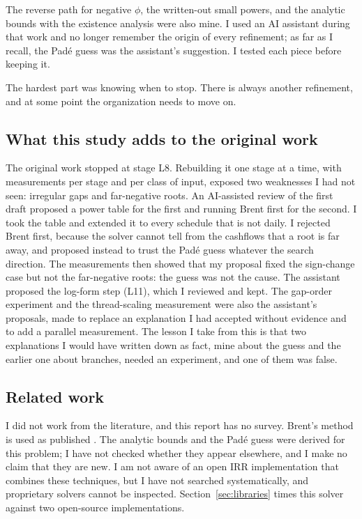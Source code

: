The reverse path for negative $\phi$, the written-out small powers, and the analytic bounds with the existence analysis were also mine. I used an AI assistant during that work and no longer remember the origin of every refinement; as far as I recall, the Pad\'e guess was the assistant's suggestion. I tested each piece before keeping it.

The hardest part was knowing when to stop. There is always another refinement, and at some point the organization needs to move on.

\subsection{What this study adds to the original work}
The original work stopped at stage L8. Rebuilding it one stage at a time, with measurements per stage and per class of input, exposed two weaknesses I had not seen: irregular gaps and far-negative roots. An AI-assisted review of the first draft proposed a power table for the first and running Brent first for the second. I took the table and extended it to every schedule that is not daily. I rejected Brent first, because the solver cannot tell from the cashflows that a root is far away, and proposed instead to trust the Pad\'e guess whatever the search direction. The measurements then showed that my proposal fixed the sign-change case but not the far-negative roots: the guess was not the cause. The assistant proposed the log-form step (L11), which I reviewed and kept. The gap-order experiment and the thread-scaling measurement were also the assistant's proposals, made to replace an explanation I had accepted without evidence and to add a parallel measurement. The lesson I take from this is that two explanations I would have written down as fact, mine about the guess and the earlier one about branches, needed an experiment, and one of them was false.

\subsection{Related work}
I did not work from the literature, and this report has no survey. Brent's method is used as published \cite{brent}. The analytic bounds and the Pad\'e guess were derived for this problem; I have not checked whether they appear elsewhere, and I make no claim that they are new. I am not aware of an open IRR implementation that combines these techniques, but I have not searched systematically, and proprietary solvers cannot be inspected. Section~\ref{sec:libraries} times this solver against two open-source implementations.

